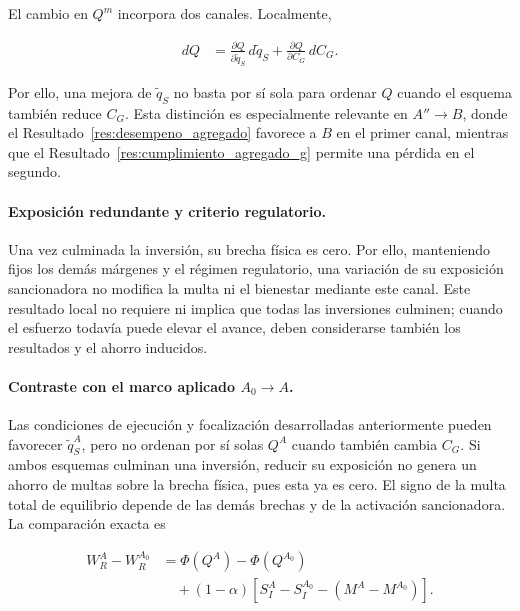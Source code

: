 El cambio en \(Q^m\) incorpora dos canales. Localmente,

\begin{equation}
\label{eq:descomposicion_local_q}
\begin{aligned}
dQ
&=
\frac{\partial Q}{\partial \widetilde q_S}
\,d\widetilde q_S
+
\frac{\partial Q}{\partial C_G}
\,dC_G.
\end{aligned}
\end{equation}

Por ello, una mejora de \(\widetilde q_S\) no basta por sí sola para ordenar \(Q\) cuando el esquema también reduce \(C_G\). Esta distinción es especialmente relevante en \(A''\to B\), donde el Resultado~\ref{res:desempeno_agregado} favorece a \(B\) en el primer canal, mientras que el Resultado~\ref{res:cumplimiento_agregado_g} permite una pérdida en el segundo.

\paragraph{Exposición redundante y criterio regulatorio.}

Una vez culminada la inversión, su brecha física es cero. Por ello, manteniendo fijos los demás márgenes y el régimen regulatorio, una variación de su exposición sancionadora no modifica la multa ni el bienestar mediante este canal. Este resultado local no requiere ni implica que todas las inversiones culminen; cuando el esfuerzo todavía puede elevar el avance, deben considerarse también los resultados y el ahorro inducidos.

\paragraph{Contraste con el marco aplicado \(A_0\to A\).}

Las condiciones de ejecución y focalización desarrolladas anteriormente pueden favorecer \(\widetilde q_S^A\), pero no ordenan por sí solas \(Q^A\) cuando también cambia \(C_G\). Si ambos esquemas culminan una inversión, reducir su exposición no genera un ahorro de multas sobre la brecha física, pues esta ya es cero. El signo de la multa total de equilibrio depende de las demás brechas y de la activación sancionadora. La comparación exacta es

\begin{equation}
\label{eq:condicion_bienestar_a_a0}
\begin{aligned}W_R^A-W_R^{A_0}&=\Phi(Q^A)-\Phi(Q^{A_0})\\&\quad+(1-\alpha)[S_I^A-S_I^{A_0}-(M^A-M^{A_0})].\end{aligned}
\end{equation}

